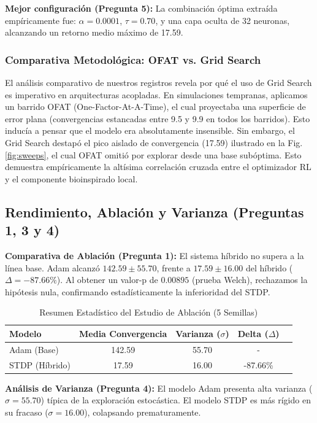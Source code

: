 \documentclass[conference, 10pt]{IEEEtran}
\begin{document}
\textbf{Mejor configuración (Pregunta 5):} La combinación óptima extraída empíricamente fue: $\alpha = 0.0001$, $\tau = 0.70$, y una capa oculta de 32 neuronas, alcanzando un retorno medio máximo de 17.59.

\subsubsection{Comparativa Metodológica: OFAT vs. Grid Search}
El análisis comparativo de nuestros registros revela por qué el uso de Grid Search es imperativo en arquitecturas acopladas. En simulaciones tempranas, aplicamos un barrido OFAT (One-Factor-At-A-Time), el cual proyectaba una superficie de error plana (convergencias estancadas entre 9.5 y 9.9 en todos los barridos). Esto inducía a pensar que el modelo era absolutamente insensible. Sin embargo, el Grid Search destapó el pico aislado de convergencia (17.59) ilustrado en la Fig. \ref{fig:sweeps}, el cual OFAT omitió por explorar desde una base subóptima. Esto demuestra empíricamente la altísima correlación cruzada entre el optimizador RL y el componente bioinspirado local.

\subsection{Rendimiento, Ablación y Varianza (Preguntas 1, 3 y 4)}
\textbf{Comparativa de Ablación (Pregunta 1):} El sistema híbrido no supera a la línea base. Adam alcanzó $142.59 \pm 55.70$, frente a $17.59 \pm 16.00$ del híbrido ($\Delta = -87.66\%$). Al obtener un valor-p de $0.00895$ (prueba Welch), rechazamos la hipótesis nula, confirmando estadísticamente la inferioridad del STDP.

\begin{table}[htbp]
\centering
\caption{Resumen Estadístico del Estudio de Ablación (5 Semillas)}
\label{tab:estadistica}
\begin{tabular}{@{}lcccc@{}}
\toprule
\textbf{Modelo} & \textbf{Media Convergencia} & \textbf{Varianza ($\sigma$)} & \textbf{Delta ($\Delta$)} \\ \midrule
Adam (Base) & 142.59 & 55.70 & - \\
STDP (Híbrido) & 17.59 & 16.00 & -87.66\% \\ \bottomrule
\end{tabular}
\end{table}

\textbf{Análisis de Varianza (Pregunta 4):} El modelo Adam presenta alta varianza ($\sigma = 55.70$) típica de la exploración estocástica. El modelo STDP es más rígido en su fracaso ($\sigma = 16.00$), colapsando prematuramente.
\end{document}
